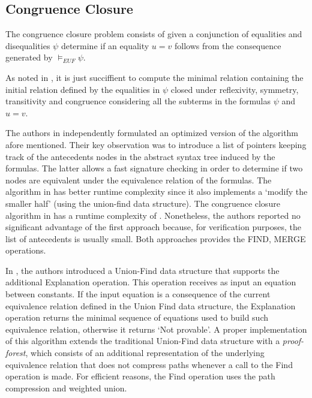 \subsection{Congruence Closure}

The congruence closure problem consists of given a 
conjunction of equalities and disequalities $\psi$ 
determine if an equality $u = v$ follows from the 
consequence generated by $\models_{EUF} 
\psi$.

As noted in \cite{10.5555/1097042}, it is just succiffient
to compute the minimal relation containing the initial 
relation defined by the
equalities in $\psi$ closed under reflexivity, symmetry,
transitivity and congruence considering all the subterms
in the formulas $\psi$ and $u = v$.

The authors in \cite{10.1145/322217.322228, 
10.1145/322186.322198} independently formulated an optimized
version of the algorithm afore mentioned. Their key observation
was to introduce a list of pointers keeping track of the
antecedents nodes in the abstract syntax tree induced by
the formulas. The latter allows a fast signature checking
in order to determine if two nodes are equivalent under
the equivalence relation of the formulas. The algorithm
in \cite{10.1145/322217.322228} has better runtime
complexity  since it also implements 
a `modify the smaller half' (using the union-find 
data structure). The congruence closure algorithm in 
\cite{10.1145/322217.322228} has a runtime complexity
of . Nonetheless, the authors reported no 
significant advantage of the first approach
because, for verification purposes, the list of antecedents is
usually small. Both approaches provides the FIND, MERGE 
operations.

In \cite{10.1007/978-3-540-32033-3_33}, the authors 
introduced a Union-Find data structure that supports the 
additional 
Explanation operation. This operation receives as input 
an equation between constants. If the input equation is 
a consequence of the current equivalence relation defined 
in the Union Find data structure, the Explanation operation 
returns the minimal sequence of equations used to build 
such equivalence relation, otherwise it returns 
`Not provable'. A proper implementation of this algorithm 
extends the traditional Union-Find data structure with 
a \emph{proof-forest}, which consists of an additional 
representation of the underlying equivalence relation that 
does not compress paths whenever a call to the Find 
operation is made. For efficient reasons, the Find 
operation uses the path compression and weighted union.

